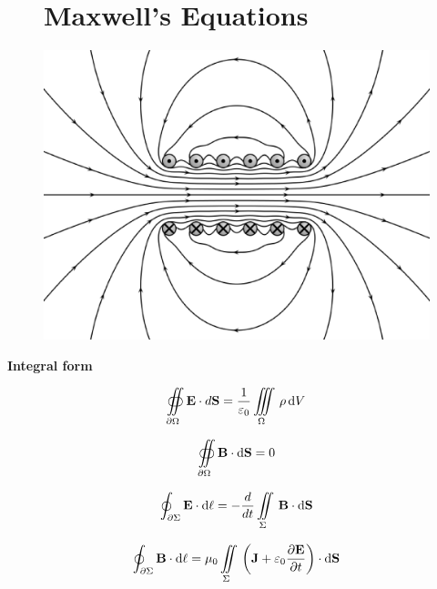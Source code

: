 \documentclass[10pt, letterpaper]{article}
\numberwithin{equation}{section}
\begin{document}
\renewcommand\thesection{2}
\begin{figure}
\section*{Maxwell's Equations}
\hrulefill \newline

\centering
\includegraphics[scale=0.44]{maxwell.eps}
\end{figure}

\begin{fleqn}
{\bf \large Integral form}

\begin{equation}
\oiint\limits_{\partial\Omega} {\bf E} \cdot d{\bf S} = \frac{1}{\varepsilon_0} \iiint\limits_{\Omega} \, \rho \, \mathrm{d}V
\end{equation}

\begin{equation}
\oiint\limits_{\partial\Omega} {\bf B} \cdot \mathrm{d}{\bf S} = 0
\end{equation}

\begin{equation}
\oint_{\partial\Sigma} {\bf E} \cdot \mathrm{d}\ell = -\frac{d}{dt} \iint\limits_{\Sigma} \, {\bf B} \cdot \mathrm{d}{\bf S}
\end{equation}

\begin{equation}
\oint_{\partial\Sigma} {\bf B} \cdot \mathrm{d}\ell = \mu_0 \iint\limits_{\Sigma} \, \bigg( {\bf J} + \varepsilon_0 \frac{\partial {\bf E}}{\partial t} \bigg) \cdot \mathrm{d{\bf S}}
\end{equation} \newline
\end{fleqn}
\end{document}
